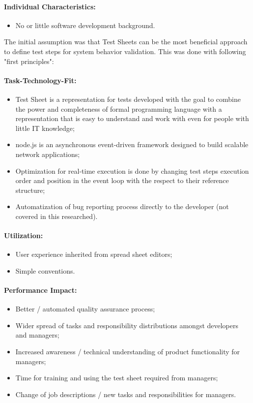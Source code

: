 \paragraph{Individual Characteristics:}
\begin{itemize}
	\item  No or little software development background.
\end{itemize}


The initial assumption was that Test Sheets can be the most beneficial approach to define test steps for system behavior validation. This was done with following "first principles":
\paragraph{Task-Technology-Fit:}
\begin{itemize}
	\item Test Sheet is a representation for tests developed with the goal to combine the power and completeness of formal programming language with a representation that is easy to understand and work with even for people with little IT knowledge\cite{ts};
	\item node.js is an asynchronous event-driven framework designed to build scalable network applications;
	\item Optimization for real-time execution is done by changing test steps execution order and position in the event loop with the respect to their reference structure;
	\item Automatization of bug reporting process directly to the developer (not covered in this researched).
\end{itemize}

\paragraph{Utilization:}
\begin{itemize}
	\item User experience inherited from spread sheet editors;
	\item Simple conventions.
\end{itemize}

\paragraph{Performance Impact:}
\begin{itemize}
	\item Better / automated quality assurance process;
	\item Wider spread of tasks and responsibility distributions amongst developers and managers;
	\item Increased awareness / technical understanding of product functionality for managers;
	\item Time for training and using the test sheet required from managers;
	\item Change of job descriptions / new tasks and responsibilities for managers.
\end{itemize}


